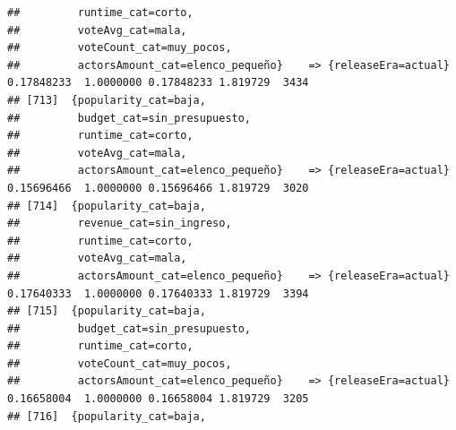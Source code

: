 \documentclass[
]{article}
\begin{document}
\begin{verbatim}
##         runtime_cat=corto,                                                                                                      
##         voteAvg_cat=mala,                                                                                                       
##         voteCount_cat=muy_pocos,                                                                                                
##         actorsAmount_cat=elenco_pequeño}    => {releaseEra=actual}               0.17848233  1.0000000 0.17848233 1.819729  3434
## [713]  {popularity_cat=baja,                                                                                                    
##         budget_cat=sin_presupuesto,                                                                                             
##         runtime_cat=corto,                                                                                                      
##         voteAvg_cat=mala,                                                                                                       
##         actorsAmount_cat=elenco_pequeño}    => {releaseEra=actual}               0.15696466  1.0000000 0.15696466 1.819729  3020
## [714]  {popularity_cat=baja,                                                                                                    
##         revenue_cat=sin_ingreso,                                                                                                
##         runtime_cat=corto,                                                                                                      
##         voteAvg_cat=mala,                                                                                                       
##         actorsAmount_cat=elenco_pequeño}    => {releaseEra=actual}               0.17640333  1.0000000 0.17640333 1.819729  3394
## [715]  {popularity_cat=baja,                                                                                                    
##         budget_cat=sin_presupuesto,                                                                                             
##         runtime_cat=corto,                                                                                                      
##         voteCount_cat=muy_pocos,                                                                                                
##         actorsAmount_cat=elenco_pequeño}    => {releaseEra=actual}               0.16658004  1.0000000 0.16658004 1.819729  3205
## [716]  {popularity_cat=baja,                                                                                                    

\end{verbatim}
\end{document}
